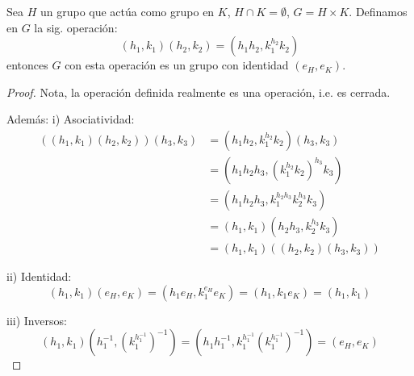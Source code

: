 \begin{prop}
	Sea $H$ un grupo que actúa como grupo en $K$, $H \cap K = \emptyset$, $G = H \times K$.
	Definamos en $G$ la sig. operación:
	\begin{equation*}
		(h_1, k_1)(h_2, k_2) = (h_1 h_2, k_1^{h_2} k_2)
	\end{equation*}
	entonces $G$ con esta operación es un grupo con identidad $(e_H, e_K)$.
\end{prop}

\begin{proof}
	Nota, la operación definida realmente es una operación, i.e. es cerrada.

	Además:
	i) Asociatividad:
	\begin{align*}
		((h_1, k_1)(h_2, k_2))(h_3, k_3) & = (h_1 h_2, k_1^{h_2} k_2)(h_3, k_3)         \\
		                                 & = (h_1 h_2 h_3, (k_1^{h_2} k_2)^{h_3} k_3)   \\
		                                 & = (h_1 h_2 h_3, k_1^{h_2 h_3} k_2^{h_3} k_3) \\
		                                 & = (h_1, k_1)(h_2 h_3, k_2^{h_3} k_3)         \\
		                                 & = (h_1, k_1)((h_2, k_2)(h_3, k_3))
	\end{align*}


	ii) Identidad:
	\begin{equation*}
		(h_1, k_1)(e_H, e_K) = (h_1 e_H, k_1^{e_H} e_K) = (h_1, k_1 e_K) = (h_1, k_1)
	\end{equation*}


	iii) Inversos:
	\begin{equation*}
		(h_1, k_1)(h_1^{-1}, (k_1^{h_1^{-1}})^{-1}) = (h_1 h_1^{-1}, k_1^{h_1^{-1}} (k_1^{h_1^{-1}})^{-1}) = (e_H, e_K)
	\end{equation*}

\end{proof}


